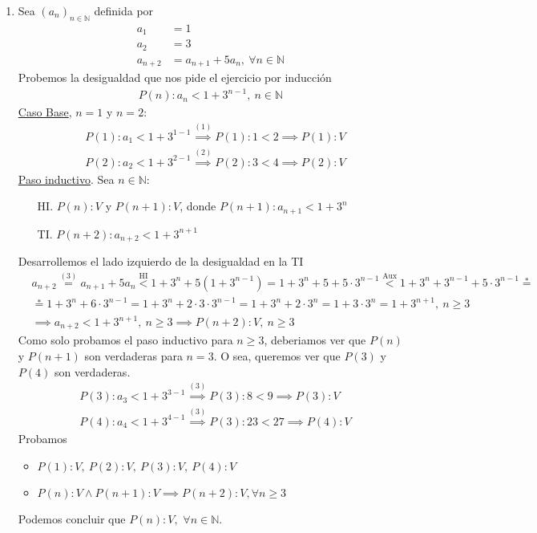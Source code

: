\begin{enumerate}[label=\roman*)]
    \item Sea $(a_n)_{n \in \mathbb{N}}$ definida por
    \setcounter{equation}{0}
    \begin{align}
        a_1 &= 1 \\
        a_2 &= 3 \\
        a_{n+2} &= a_{n+1} + 5a_n,\ \forall n \in \mathbb{N}
    \end{align}
    Probemos la desigualdad que nos pide el ejercicio por inducción
    \begin{align*}
        P(n): a_n < 1 + 3^{n-1},\ n \in \mathbb{N}   
    \end{align*}
    \underline{Caso Base}, $n = 1$ y $n = 2$:
    \begin{align*}
        &P(1): a_1 < 1 + 3^{1-1} \overset{(1)}{\implies} P(1): 1 < 2 \implies P(1):V \\
        &P(2): a_2 < 1 + 3^{2-1} \overset{(2)}{\implies} P(2): 3 < 4 \implies P(2):V
    \end{align*}
    \underline{Paso inductivo}. Sea $n \in \mathbb{N}$:
    \begin{enumerate}
        \item[HI.] $P(n):V \text{ y } P(n+1):V$, donde $P(n+1): a_{n+1} < 1 + 3^n$
        \item[TI.] $P(n+2): a_{n+2} < 1 + 3^{n+1}$
    \end{enumerate}
        Desarrollemos el lado izquierdo de la desigualdad en la TI
    \begin{align*}
        &a_{n+2} \overset{(3)}{=} a_{n+1} + 5a_n \overset{\text{HI}}{<} 1 + 3^n + 5(1 + 3^{n-1}) = 
        1 + 3^n + 5 + 5 \cdot 3^{n-1} \overset{\text{Aux}}{<} 1 + 3^n + 3^{n-1} + 5 \cdot 3^{n-1} \overset{*}{=} \\
        &\overset{*}{=} 1 + 3^n + 6 \cdot 3^{n-1} = 1 + 3^n + 2 \cdot 3 \cdot 3^{n-1} 
        = 1 + 3^n + 2 \cdot 3^n = 1 + 3 \cdot 3^n = 1 + 3^{n+1},\ n \geq 3 \\
        &\implies a_{n+2} < 1 + 3^{n+1},\ n \geq 3 \implies P(n+2):V,\ n \geq 3
    \end{align*}
    Como solo probamos el paso inductivo para $n \geq 3$, deberiamos ver que $P(n)$ y $P(n+1)$ son verdaderas para $n = 3$. O sea, 
    queremos ver que $P(3)$ y $P(4)$ son verdaderas.
    \begin{align*}
        &P(3): a_3 < 1 + 3^{3-1} \overset{(3)}{\implies} P(3): 8 < 9 \implies P(3):V \\
        &P(4): a_4 < 1 + 3^{4-1} \overset{(3)}{\implies} P(3): 23 < 27 \implies P(4):V
    \end{align*}
    Probamos
    \begin{itemize}
        \item $P(1):V,\ P(2):V,\ P(3):V,\ P(4):V$
        \item $P(n):V \land P(n+1):V \implies P(n+2):V, \forall n \geq 3$
    \end{itemize}
    Podemos concluir que $P(n):V,$ $\forall n \in \mathbb{N}$.
    

\end{enumerate}

